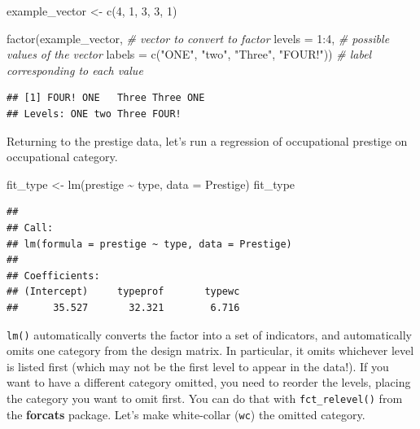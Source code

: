 \documentclass[
  12pt,
  oneside,openany]{book}
\newenvironment{Shaded}{\begin{snugshade}}{\end{snugshade}}
\newcommand{\AttributeTok}[1]{\textcolor[rgb]{0.77,0.63,0.00}{#1}}
\newcommand{\CommentTok}[1]{\textcolor[rgb]{0.56,0.35,0.01}{\textit{#1}}}
\newcommand{\DecValTok}[1]{\textcolor[rgb]{0.00,0.00,0.81}{#1}}
\newcommand{\FunctionTok}[1]{\textcolor[rgb]{0.00,0.00,0.00}{#1}}
\newcommand{\NormalTok}[1]{#1}
\newcommand{\OtherTok}[1]{\textcolor[rgb]{0.56,0.35,0.01}{#1}}
\newcommand{\SpecialCharTok}[1]{\textcolor[rgb]{0.00,0.00,0.00}{#1}}
\newcommand{\StringTok}[1]{\textcolor[rgb]{0.31,0.60,0.02}{#1}}
\begin{document}
\begin{Shaded}
\begin{Highlighting}[]
\NormalTok{example\_vector }\OtherTok{\textless{}{-}} \FunctionTok{c}\NormalTok{(}\DecValTok{4}\NormalTok{, }\DecValTok{1}\NormalTok{, }\DecValTok{3}\NormalTok{, }\DecValTok{3}\NormalTok{, }\DecValTok{1}\NormalTok{)}

\FunctionTok{factor}\NormalTok{(example\_vector,  }\CommentTok{\# vector to convert to factor}
       \AttributeTok{levels =} \DecValTok{1}\SpecialCharTok{:}\DecValTok{4}\NormalTok{,    }\CommentTok{\# possible values of the vector}
       \AttributeTok{labels =} \FunctionTok{c}\NormalTok{(}\StringTok{"ONE"}\NormalTok{,}
                  \StringTok{"two"}\NormalTok{,}
                  \StringTok{"Three"}\NormalTok{,}
                  \StringTok{"FOUR!"}\NormalTok{))  }\CommentTok{\# label corresponding to each value}
\end{Highlighting}
\end{Shaded}

\begin{verbatim}
## [1] FOUR! ONE   Three Three ONE  
## Levels: ONE two Three FOUR!
\end{verbatim}

Returning to the prestige data, let's run a regression of occupational prestige on occupational category.

\begin{Shaded}
\begin{Highlighting}[]
\NormalTok{fit\_type }\OtherTok{\textless{}{-}} \FunctionTok{lm}\NormalTok{(prestige }\SpecialCharTok{\textasciitilde{}}\NormalTok{ type, }\AttributeTok{data =}\NormalTok{ Prestige)}
\NormalTok{fit\_type}
\end{Highlighting}
\end{Shaded}

\begin{verbatim}
## 
## Call:
## lm(formula = prestige ~ type, data = Prestige)
## 
## Coefficients:
## (Intercept)     typeprof       typewc  
##      35.527       32.321        6.716
\end{verbatim}

\texttt{lm()} automatically converts the factor into a set of indicators, and automatically omits one category from the design matrix. In particular, it omits whichever level is listed first (which may not be the first level to appear in the data!). If you want to have a different category omitted, you need to reorder the levels, placing the category you want to omit first. You can do that with \texttt{fct\_relevel()} from the \textbf{forcats} package. Let's make white-collar (\texttt{wc}) the omitted category.
\end{document}
